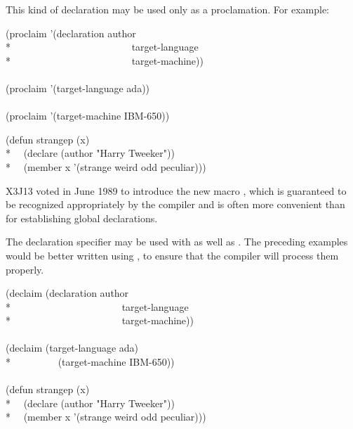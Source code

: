 \begin{flushdesc}
\begin{obsolete}
This kind of declaration may be used only as a proclamation.
For example:
\begin{lisp}
(proclaim '(declaration author \\*
~~~~~~~~~~~~~~~~~~~~~~~~target-language \\*
~~~~~~~~~~~~~~~~~~~~~~~~target-machine)) \\
 \\
(proclaim '(target-language ada)) \\
 \\
(proclaim '(target-machine IBM-650))
\end{lisp}
\newpage%
\begin{lisp}
(defun strangep (x) \\*
~~(declare (author "Harry Tweeker")) \\*
~~(member x '(strange weird odd peculiar)))
\end{lisp}
\end{obsolete}

\begin{newer}
X3J13 voted in June 1989 
to introduce the new macro , which is guaranteed
to be recognized appropriately by the compiler and is often more convenient
than  for establishing global declarations.

The  declaration specifier may be used with 
as well as .  The preceding examples would be better written
using , to ensure that the compiler will process them properly.

\begin{lisp}
(declaim (declaration author \\*
~~~~~~~~~~~~~~~~~~~~~~target-language \\*
~~~~~~~~~~~~~~~~~~~~~~target-machine)) \\
 \\
(declaim (target-language ada) \\*
~~~~~~~~~(target-machine IBM-650)) \\
 \\
(defun strangep (x) \\*
~~(declare (author "Harry Tweeker")) \\*
~~(member x '(strange weird odd peculiar)))
\end{lisp}
\end{newer}
\end{flushdesc}

